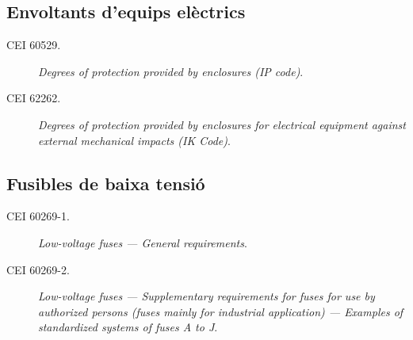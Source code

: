 \subsection*{Envoltants d'equips elèctrics}
\begin{description}
	\item [\hspace{5mm}CEI 60529.] \textit{Degrees of protection provided by enclosures (IP code)}.
	\item [\hspace{5mm}CEI 62262.] \textit{Degrees of protection provided by enclosures for electrical equipment against external mechanical impacts (IK Code)}.
\end{description}

\subsection*{Fusibles de baixa tensió}
\begin{description}
    \item [\hspace{5mm}CEI 60269-1.] \textit{Low-voltage fuses --- General requirements}.
    \item [\hspace{5mm}CEI 60269-2.] \textit{Low-voltage fuses --- Supplementary requirements for fuses for use by authorized persons
          (fuses mainly for industrial application) --- Examples of standardized systems of fuses A to J}.
\end{description}

